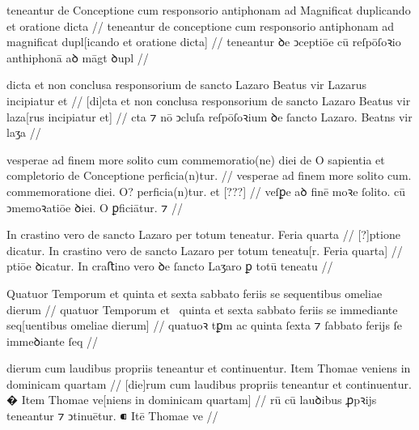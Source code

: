 \ex \bg
\gla
{}
teneantur de Conceptione cum responsorio antiphonam ad Magnificat duplicando et oratione
dicta
//
\glRekonstrukcja
{}
teneantur de conceptione cum responsorio antiphonam ad magnificat dupl[icando et oratione
dicta]
//
\glU
{}
teneantur ꝺe ↄceptiōe cū reſpōſoꝛio anthiphonā aꝺ māgt ꝺupl   
//
\endgl
\xe




\ex \bg
\gla
{}
dicta et non conclusa responsorium de sancto Lazaro Beatus vir Lazarus
incipiatur et 
//
\glRekonstrukcja
{}
[di]cta et non conclusa responsorium de sancto Lazaro Beatus vir laza[rus
incipiatur et] 
//
\glU
{}
cta ⁊ nō ↄcluſa reſpōſoꝛium ꝺe ſancto Lazaro. Beatns vir laʒa  
//
\endgl
\xe



\ex \bg
\gla
{}
vesperae ad finem more solito cum commemoratio(ne) diei
de O sapientia et completorio de Conceptione perficia(n)tur.
//
\glRekonstrukcja
{}
vesperae ad finem more solito cum. commemoratione diei.
{} O? {} {} {} {} perficia(n)tur. et
[???]
//
\glU
{}
veſꝑe aꝺ finē moꝛe ſolito. cū ↄmemoꝛatiōe ꝺiei. {} O {} {} {} {} ꝑficiātur. ⁊ 
//
\endgl
\xe



\ex \bg
\gla
{} %
{} {} In crastino vero de sancto Lazaro per totum teneatur.
Feria quarta 
//
\glRekonstrukcja
{} %
[?]ptione dicatur.
In crastino vero de sancto Lazaro per totum teneatu[r.
Feria quarta] 
//
\glU
{}
ptiōe ꝺicatur. In craﬅino vero ꝺe ſancto Laʒaro ꝑ totū teneatu  
//
\endgl
\xe



\ex \bg
\gla
{}
Quatuor Temporum et quinta et sexta sabbato feriis se
{} sequentibus omeliae dierum
//
\glRekonstrukcja
{}
quatuor Temporum et~ quinta et sexta sabbato feriis se
immediante seq[uentibus omeliae dierum]
//
\glU
{}
quatuoꝛ tꝑm ac quinta {} ſexta ⁊ ſabbato ferijs ſe immeꝺiante ſeq  
//
\endgl
\xe



\ex \bg
\gla
{}
dierum cum laudibus propriis teneantur et continuentur.
{} Item Thomae veniens in dominicam quartam
//
\glRekonstrukcja
{}
[die]rum cum laudibus propriis teneantur et continuentur.
� Item Thomae ve[niens in dominicam quartam]
//
\glU
{}
rū cū lauꝺibus ꝓpꝛijs teneantur ⁊ ↄtinuētur. ⁌ Itē Thomae ve   
//
\endgl
\xe


